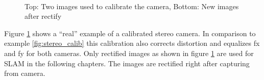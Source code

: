 \documentclass[11pt,a4paper,titlepage,oneside]{report}
\begin{document}
\begin{figure}[H]
	\centering
	\\
	\caption{Top: Two images used to calibrate the camera, Bottom: New images after rectify}\label{fig:calibration_real}
\end{figure}

Figure \ref{fig:calibration_real} shows a ``real'' example of a calibrated stereo camera. In comparison to example \ref{fig:stereo_calib} this calibration also corrects distortion and equalizes fx and fy for both cameras. Only rectified images as shown in figure \ref{fig:calibration_real} are used for SLAM in the following chapters. The images are rectified right after capturing from camera.\\
\end{document}
